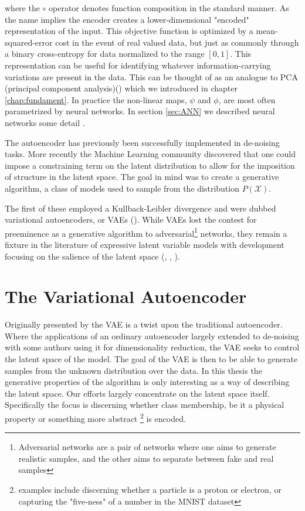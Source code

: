 \noindent where the $\circ$ operator denotes function composition in the standard manner. As the name implies the encoder creates a lower-dimensional "encoded" representation of the input. This objective function is optimized by a mean-squared-error cost in the event of real valued data, but just as commonly through a binary cross-entropy for data normalized to the range $[0, 1]$. This representation can be useful for identifying whatever information-carrying variations are present in the data. This can be thought of as an analogue to PCA (principal component analysis)(\cite{Marsland2009}) which we introduced in chapter \ref{chap:fundament}. In practice the non-linear maps, $\psi$ and $\phi$, are most often parametrized by neural networks. In section \ref{sec:ANN} we described neural networks some detail .

The autoencoder has previously been successfully implemented in de-noising tasks.  More recently the Machine Learning community discovered that one could impose a constraining term on the latent distribution to allow for the imposition of structure in the latent space. The goal in mind was to create a generative algorithm, a class of models used to sample from the distribution $P(\mathcal{X})$.

The first of these employed a Kullback-Leibler divergence and were dubbed variational autoencoders, or VAEs (\cite{Kingma2013}). While VAEs lost the contest for preeminence as a generative algorithm to adversarial\footnote{Adversarial networks are a pair of networks where one aims to generate realistic samples, and the other aims to separate between fake and real samples} networks, they remain a fixture in the literature of expressive latent variable models with development focusing on the salience of the latent space (\cite{Higgins2017}, \cite{Zhao}, \cite{Fertig}).

\section{The Variational Autoencoder}\label{sec:vae}

Originally presented by \citet{Kingma2013} the VAE is a twist upon the traditional autoencoder. Where the applications of an ordinary autoencoder largely extended to de-noising with some authors using it for dimensionality reduction, the VAE seeks to control the latent space of the model. The goal of the VAE is then to be able to generate samples from the unknown distribution over the data. In this thesis the generative properties of the algorithm is only interesting as a way of describing the latent space. Our efforts largely concentrate on the latent space itself. Specifically the focus is discerning whether class membership, be it a physical property or something more abstract \footnote{examples include discerning whether a particle is  a proton or electron, or capturing the "five-ness" of a number in the MNIST dataset} is encoded.

